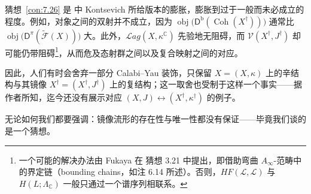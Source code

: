 \begin{Rem}\label{rem:7.27}
猜想~\ref{con:7.26} 是 \cite{Kon94} 中 Kontsevich 所给版本的膨胀，膨胀到过于一般而未必成立的程度。例如，对象之间的双射并不成立，因为 $\operatorname{obj}\bigl(\mathsf D^{\mathrm b}(\operatorname{Coh}(X^\dagger))\bigr)$ 通常比 $\operatorname{obj}\bigl(\mathsf D^\pi(\widetilde{\mathcal F}(X))\bigr)$ 大。此外，$\mathcal Lag(X,\kappa^{\mathbb C})$ 先验地无阻碍，而 $\mathcal V(X^\dagger,J^\dagger)$ 却可能仍带阻碍\footnote{一个可能的解决办法由 Fukaya 在 \cite{Fuk02a} 猜想 3.21 中提出，即借助弯曲 $A_\infty$-范畴中的界定链（bounding chains，如注 6.14 所述）。否则，$HF(\mathcal L,\mathcal L)$ 与 $H(L;\Lambda_{\mathbb C})$ 一般只通过一个谱序列相联系。}，从而危及态射群之间以及复合映射之间的对应。

因此，人们有时会舍弃一部分 Calabi–Yau 装饰，只保留 $X=(X,\kappa)$ 上的辛结构与其镜像 $X^\dagger=(X^\dagger,J^\dagger)$ 上的复结构；这一取舍也受制于这样一个事实——据作者所知，迄今还没有展示对应 $(X,J)\leftrightarrow(X^\dagger,\kappa^\dagger)$ 的例子。

无论如何我们都要强调：镜像流形的存在性与唯一性都没有保证——毕竟我们谈的是一个猜想。
\end{Rem}

